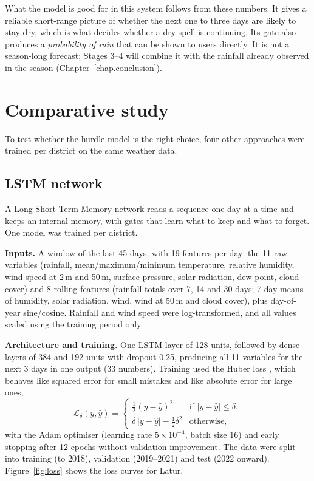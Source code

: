 What the model is good for in this system follows from these numbers. It gives a reliable short-range picture of whether the next one to three days are likely to stay dry, which is what decides whether a dry spell is continuing. Its gate also produces a \emph{probability of rain} that can be shown to users directly. It is not a season-long forecast; Stages 3--4 will combine it with the rainfall already observed in the season (Chapter~\ref{chap.conclusion}).

\section{Comparative study}
To test whether the hurdle model is the right choice, four other approaches were trained per district on the same weather data.

\subsection{LSTM network}
A Long Short-Term Memory network \cite{hochreiter1997long} reads a sequence one day at a time and keeps an internal memory, with gates that learn what to keep and what to forget. One model was trained per district.

\textbf{Inputs.} A window of the last 45 days, with 19 features per day: the 11 raw variables (rainfall, mean/maximum/minimum temperature, relative humidity, wind speed at 2\,m and 50\,m, surface pressure, solar radiation, dew point, cloud cover) and 8 rolling features (rainfall totals over 7, 14 and 30 days; 7-day means of humidity, solar radiation, wind, wind at 50\,m and cloud cover), plus day-of-year sine/cosine. Rainfall and wind speed were log-transformed, and all values scaled using the training period only.

\textbf{Architecture and training.} One LSTM layer of 128 units, followed by dense layers of 384 and 192 units with dropout 0.25, producing all 11 variables for the next 3 days in one output (33 numbers). Training used the Huber loss \cite{huber1964robust}, which behaves like squared error for small mistakes and like absolute error for large ones,
\begin{equation}
	\mathcal{L}_\delta(y,\hat{y}) =
	\begin{cases}
		\tfrac{1}{2}(y-\hat{y})^2 & \text{if } |y-\hat{y}| \le \delta,\\
		\delta\,|y-\hat{y}| - \tfrac{1}{2}\delta^2 & \text{otherwise,}
	\end{cases}
\end{equation}
with the Adam optimiser \cite{kingma2015adam} (learning rate $5\times10^{-4}$, batch size 16) and early stopping after 12 epochs without validation improvement. The data were split into training (to 2018), validation (2019--2021) and test (2022 onward). Figure~\ref{fig:loss} shows the loss curves for Latur.

